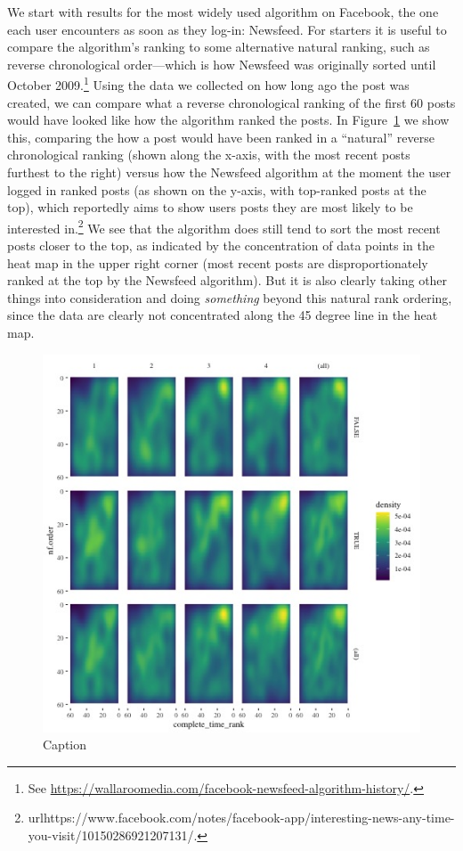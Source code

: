 \documentclass[12pt,letterpaper]{article}
\begin{document}
We start with results for the most widely used algorithm on Facebook, the one each user encounters as soon as they log-in: Newsfeed. For starters it is useful to compare the algorithm's ranking to some alternative natural ranking, such as reverse chronological order---which is how Newsfeed was originally sorted until October 2009.\footnote{See \url{https://wallaroomedia.com/facebook-newsfeed-algorithm-history/}.} Using the data we collected on how long ago the post was created, we can compare what a reverse chronological ranking of the first 60 posts would have looked like how the algorithm ranked the posts. In Figure~\ref{fig:nftime} we show this, comparing the how a post would have been ranked in a ``natural'' reverse chronological ranking (shown along the x-axis, with the most recent posts furthest to the right) versus how the Newsfeed algorithm at the moment the user logged in ranked posts (as shown on the y-axis, with top-ranked posts at the top), which reportedly aims to show users posts they are most likely to be interested in.\footnote{url{https://www.facebook.com/notes/facebook-app/interesting-news-any-time-you-visit/10150286921207131/}.} We see that the algorithm does still tend to sort the most recent posts closer to the top, as indicated by the concentration of data points in the heat map in the upper right corner (most recent posts are disproportionately ranked at the top by the Newsfeed algorithm). But it is also clearly taking other things into consideration and doing \emph{something} beyond this natural rank ordering, since the data are clearly not concentrated along the 45 degree line in the heat map.

\begin{figure}[h]
    \centering
    \includegraphics[scale=.8]{Output/Graphs/Audit/Heatmaps/India NF chron rank by nf rank by norm quartile - smooth.jpg}
    \caption{Caption}
    \label{fig:nftime}
\end{figure}
\end{document}
